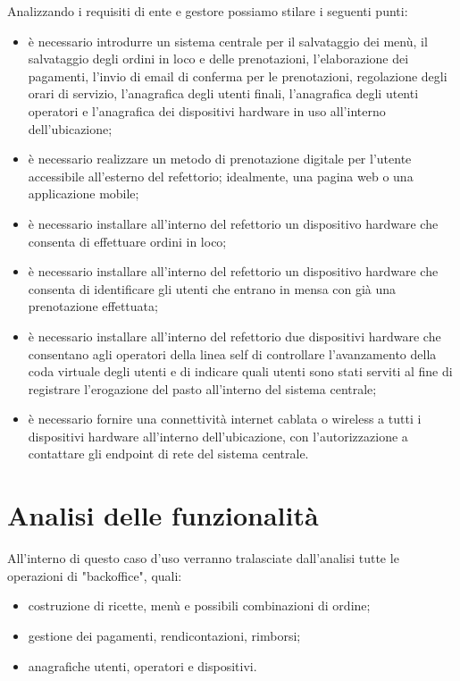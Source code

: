 \documentclass[a4paper, titlepage, 12pt, openright, oneside]{book}
\begin{document}
Analizzando i requisiti di ente e gestore possiamo stilare i seguenti punti:
\begin{itemize}
	\item è necessario introdurre un sistema centrale per il salvataggio dei menù, il salvataggio degli ordini in loco e delle prenotazioni,
		  l'elaborazione dei pagamenti, l'invio di email di conferma per le prenotazioni, regolazione degli orari di servizio, l'anagrafica degli utenti finali, l'anagrafica degli
		  utenti operatori e l'anagrafica dei dispositivi hardware in uso all'interno dell'ubicazione;
	\item è necessario realizzare un metodo di prenotazione digitale per l'utente accessibile all'esterno del refettorio; idealmente, una pagina web o una applicazione mobile;
	\item è necessario installare all'interno del refettorio un dispositivo hardware che consenta di effettuare ordini in loco;
	\item è necessario installare all'interno del refettorio un dispositivo hardware che consenta di identificare gli utenti che entrano in mensa con già una prenotazione effettuata;
	\item è necessario installare all'interno del refettorio due dispositivi hardware che consentano agli operatori della linea self di controllare l'avanzamento della coda virtuale degli utenti e di indicare quali utenti sono stati serviti al fine di registrare l'erogazione del pasto all'interno del sistema centrale;
	\item è necessario fornire una connettività internet cablata o wireless a tutti i dispositivi hardware all'interno dell'ubicazione, con l'autorizzazione a contattare gli endpoint di rete del sistema centrale.
\end{itemize}

\section{Analisi delle funzionalità}

All'interno di questo caso d'uso verranno tralasciate dall'analisi tutte le operazioni di "backoffice", quali:
\begin{itemize}
	\item costruzione di ricette, menù e possibili combinazioni di ordine;
	\item gestione dei pagamenti, rendicontazioni, rimborsi;
	\item anagrafiche utenti, operatori e dispositivi.
\end{itemize}
\end{document}
